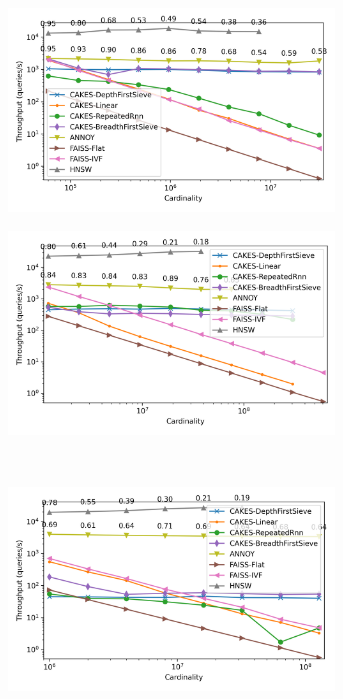 \begin{figure}
    \begin{subfigure}[b]{0.47\textwidth}
        \includegraphics[width=0.95\textwidth]{plots/fashion-mnist-knn-10.png}
        \label{fig:results:fashion-mnist-scaling}
    \end{subfigure}%
    \begin{subfigure}[b]{0.47\textwidth}
        \includegraphics[width=0.95\textwidth]{plots/glove-25-knn-10.png}
        \label{fig:results:glove-25-scaling}
    \end{subfigure}%
    \vspace{1em}
    \\
    \begin{subfigure}[b]{0.47\textwidth}
        \includegraphics[width=0.95\textwidth]{plots/sift-knn-10.png}

\end{subfigure}
\end{figure}
